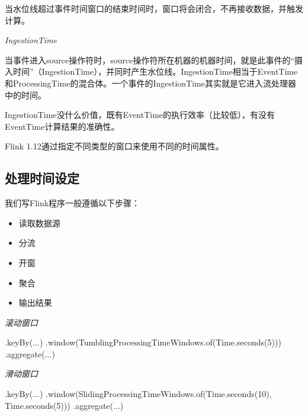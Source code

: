 \documentclass[cn,11pt,chinese]{elegantbook}
\newenvironment{Shaded}{}{}
\newcommand{\BuiltInTok}[1]{#1}
\newcommand{\DecValTok}[1]{\textcolor[rgb]{0.25,0.63,0.44}{#1}}
\newcommand{\FunctionTok}[1]{\textcolor[rgb]{0.02,0.16,0.49}{#1}}
\newcommand{\NormalTok}[1]{#1}
\providecommand{\tightlist}{%
  \setlength{\itemsep}{0pt}\setlength{\parskip}{0pt}}
\renewenvironment{quote}{\begin{customblockquote}\list{}{\rightmargin=0em\leftmargin=0em}%
\item\relax\color{blockquote-text}\ignorespaces}{\unskip\unskip\endlist\end{customblockquote}}
\begin{document}
\begin{quote}
当水位线超过事件时间窗口的结束时间时，窗口将会闭合，不再接收数据，并触发计算。
\end{quote}

\emph{IngestionTime}

当事件进入source操作符时，source操作符所在机器的机器时间，就是此事件的``摄入时间''（IngestionTime），并同时产生水位线。IngestionTime相当于EventTime和ProcessingTime的混合体。一个事件的IngestionTime其实就是它进入流处理器中的时间。

\begin{quote}
IngestionTime没什么价值，既有EventTime的执行效率（比较低），有没有EventTime计算结果的准确性。
\end{quote}

Flink 1.12通过指定不同类型的窗口来使用不同的时间属性。

\hypertarget{ux5904ux7406ux65f6ux95f4ux8bbeux5b9a}{%
\subsection{处理时间设定}\label{ux5904ux7406ux65f6ux95f4ux8bbeux5b9a}}

我们写Flink程序一般遵循以下步骤：

\begin{itemize}
\tightlist
\item
  读取数据源
\item
  分流
\item
  开窗
\item
  聚合
\item
  输出结果
\end{itemize}

\emph{滚动窗口}

\begin{Shaded}
\begin{Highlighting}[]
\NormalTok{.}\FunctionTok{keyBy}\NormalTok{(...)}
\NormalTok{.}\FunctionTok{window}\NormalTok{(TumblingProcessingTimeWindows.}\FunctionTok{of}\NormalTok{(}\BuiltInTok{Time}\NormalTok{.}\FunctionTok{seconds}\NormalTok{(}\DecValTok{5}\NormalTok{)))}
\NormalTok{.}\FunctionTok{aggregate}\NormalTok{(...)}
\end{Highlighting}
\end{Shaded}

\emph{滑动窗口}

\begin{Shaded}
\begin{Highlighting}[]
\NormalTok{.}\FunctionTok{keyBy}\NormalTok{(...)}
\NormalTok{.}\FunctionTok{window}\NormalTok{(SlidingProcessingTimeWindows.}\FunctionTok{of}\NormalTok{(}\BuiltInTok{Time}\NormalTok{.}\FunctionTok{seconds}\NormalTok{(}\DecValTok{10}\NormalTok{), }\BuiltInTok{Time}\NormalTok{.}\FunctionTok{seconds}\NormalTok{(}\DecValTok{5}\NormalTok{)))}
\NormalTok{.}\FunctionTok{aggregate}\NormalTok{(...)}
\end{Highlighting}
\end{Shaded}
\end{document}
